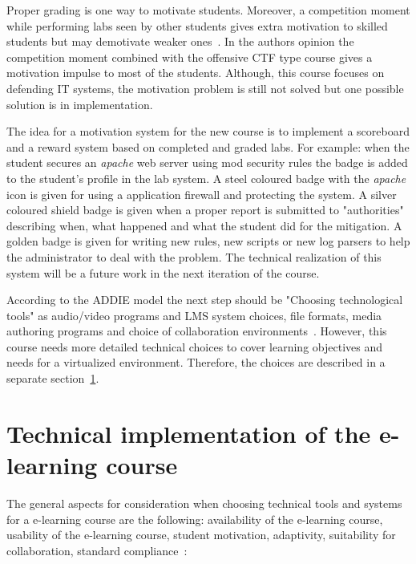 Proper grading is one way to motivate students. Moreover, a competition moment while performing labs seen by other students gives extra motivation to skilled students but may demotivate weaker ones~\citep{KasakKaur}. In the authors opinion the competition moment combined with the offensive \gls{CTF} type course gives a motivation impulse to most of the students. Although, this course focuses on defending IT systems, the motivation problem is still not solved but one possible solution is in implementation.

The idea for a motivation system for the new course is to implement a scoreboard and a reward system based on completed and graded labs. For example: when the student secures an \emph{apache} web server using mod security rules the badge is added to the student's profile in the lab system. A steel coloured badge with the \emph{apache} icon is given for using a application firewall and protecting the system. A silver coloured shield badge is given when a proper report is submitted to "authorities" describing when, what happened and what the student did for the mitigation. A golden badge is given for writing new rules, new scripts or new log parsers to help the administrator to deal with the problem. The technical  realization of this system will be a future work in the next iteration of the course.

According to the \gls{ADDIE} model the next step should be "Choosing technological tools" as audio/video programs and \gls{LMS} system choices, file formats, media authoring programs and choice of collaboration environments~\citep{OppeArenduskeskus2010}. However, this course needs more detailed technical choices to cover learning objectives and needs for a virtualized environment. Therefore, the choices are described in a separate section~\ref{Technical implementation of the e-learning course}.

\section{Technical implementation of the e-learning course}
\label{Technical implementation of the e-learning course}

The general aspects for consideration when choosing technical tools and systems for a e-learning course are the following: availability of the e-learning course, usability of the e-learning course, student motivation, adaptivity, suitability for collaboration, standard compliance~\citep{OppeArenduskeskus2010}:

